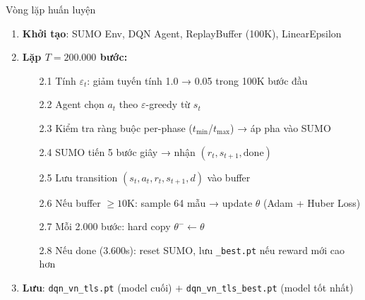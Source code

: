 \begin{frame}{Vòng lặp huấn luyện}
  \begin{enumerate}
    \setlength{\itemsep}{3pt}
    \item \textbf{Khởi tạo}: SUMO Env, DQN Agent, ReplayBuffer (100K), LinearEpsilon
    \vspace{4pt}
    \item \textbf{Lặp $T = 200.000$ bước:}
      \begin{enumerate}
        \setlength{\itemsep}{2pt}
        \item[2.1] Tính $\varepsilon_t$: giảm tuyến tính 1.0 → 0.05 trong 100K bước đầu
        \item[2.2] Agent chọn $a_t$ theo $\varepsilon$-greedy từ $s_t$
        \item[2.3] Kiểm tra ràng buộc per-phase ($t_{\min}$/$t_{\max}$) → áp pha vào SUMO
        \item[2.4] SUMO tiến 5 bước giây → nhận $(r_t, s_{t+1}, \text{done})$
        \item[2.5] Lưu transition $(s_t, a_t, r_t, s_{t+1}, d)$ vào buffer
        \item[2.6] Nếu buffer $\geq 10$K: sample 64 mẫu → update $\theta$ (Adam + Huber Loss)
        \item[2.7] Mỗi 2.000 bước: hard copy $\theta^- \leftarrow \theta$
        \item[2.8] Nếu done (3.600s): reset SUMO, lưu \texttt{\_best.pt} nếu reward mới cao hơn
      \end{enumerate}
    \vspace{4pt}
    \item \textbf{Lưu}: \texttt{dqn\_vn\_tls.pt} (model cuối) $+$ \texttt{dqn\_vn\_tls\_best.pt} (model tốt nhất)
  \end{enumerate}
\end{frame}
